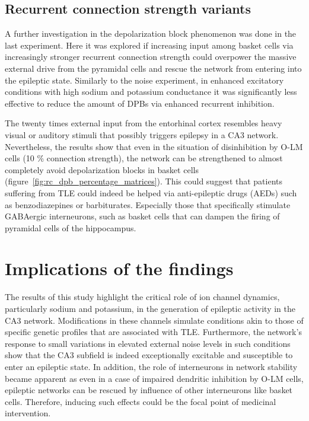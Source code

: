 \subsection{Recurrent connection strength variants}
A further investigation in the depolarization block phenomenon was done in the last experiment.
Here it was explored if increasing input among basket cells via increasingly stronger recurrent connection strength
could overpower the massive external drive from the pyramidal cells and rescue the network from entering into the epileptic state.
Similarly to the noise experiment, in enhanced excitatory conditions with high sodium and potassium conductance it was significantly less effective to reduce
the amount of DPBs via enhanced recurrent inhibition.

The twenty times external input from the entorhinal cortex resembles heavy visual or auditory stimuli that possibly triggers
epilepsy in a CA3 network. Nevertheless, the results show that even in the situation of disinhibition by O-LM cells (10 \% connection strength),
the network can be strengthened to almost completely avoid depolarization blocks in basket cells (figure~\ref{fig:rc_dpb_percentage_matrices}).
This could suggest that patients suffering from TLE could indeed be helped via anti-epileptic drugs (AEDs) such as benzodiazepines or barbiturates.
Especially those that specifically stimulate GABAergic interneurons, such as basket cells that can dampen the firing of pyramidal cells of the hippocampus.

\section{Implications of the findings}
The results of this study highlight the critical role of ion channel dynamics, particularly sodium and potassium, in the generation of epileptic activity in the CA3 network.
Modifications in these channels simulate conditions akin to those of specific genetic profiles that are associated with TLE\@.
Furthermore, the network's response to small variations in elevated external noise levels in such conditions show that the CA3 subfield is indeed exceptionally
excitable and susceptible to enter an epileptic state. In addition, the role of interneurons in network stability became apparent as
even in a case of impaired dendritic inhibition by O-LM cells, epileptic networks can be rescued by influence of other interneurons like basket cells.
Therefore, inducing such effects could be the focal point of medicinal intervention.

